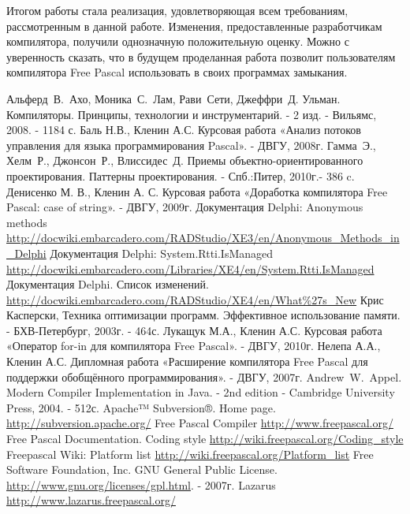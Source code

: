 \documentclass{imcs}
\begin{document}
Итогом работы стала реализация, удовлетворяющая всем требованиям, рассмотренным в данной работе.
Изменения, предоставленные разработчикам компилятора, получили однозначную положительную
оценку\cite{mantis}. Можно с уверенность сказать, что в будущем проделанная работа позволит
пользователям компилятора Free Pascal использовать в своих программах замыкания.

\pagebreak

\begin{thebibliography}{99}
 Альферд~В.~Ахо, Моника~С.~Лам, Рави~Сети, Джеффри~Д. Ульман. Компиляторы. Принципы, технологии и инструментарий. - 2 изд. - Вильямс, 2008. - 1184 с.
 Баль Н.В., Кленин А.С. Курсовая работа «Анализ потоков управления для языка программирования Pascal». - ДВГУ, 2008г.
 Гамма~Э., Хелм~Р., Джонсон~Р., Влиссидес~Д. Приемы объектно-ориентированного проектирования. Паттерны проектирования. - Спб.:Питер, 2010г.- 386 c.
 Денисенко М. В., Кленин А. С. Курсовая работа «Доработка компилятора Free Pascal: case of string». - ДВГУ, 2009г.
 Документация Delphi: Anonymous methods \url{http://docwiki.embarcadero.com/RADStudio/XE3/en/Anonymous_Methods_in_Delphi}
 Документация Delphi: System.Rtti.IsManaged \url{http://docwiki.embarcadero.com/Libraries/XE4/en/System.Rtti.IsManaged}
 Документация Delphi. Список изменений. \url{http://docwiki.embarcadero.com/RADStudio/XE4/en/What\%27s\_New}
 Крис Касперски, Техника оптимизации программ. Эффективное использование памяти. - БХВ-Петербург, 2003г. - 464с.
 Лукащук М.А., Кленин А.С. Курсовая работа «Оператор for-in для компилятора Free Pascal». - ДВГУ, 2010г.
 Нелепа А.А., Кленин А.С. Дипломная работа «Расширение компилятора Free Pascal для поддержки обобщённого программирования». - ДВГУ, 2007г.
 Andrew~W.~Appel. Modern Compiler Implementation in Java. - 2nd edition - Cambridge University Press, 2004. - 512с.
 Apache™ Subversion®. Home page. \url{http://subversion.apache.org/}
 Free Pascal Compiler \url{http://www.freepascal.org/}
 Free Pascal Documentation. Coding style \url{http://wiki.freepascal.org/Coding_style}
 Freepascal Wiki: Platform list \url{http://wiki.freepascal.org/Platform_list}
 Free Software Foundation, Inc. GNU General Public License. \url{http://www.gnu.org/licenses/gpl.html}. - 2007г.
 Lazarus \url{http://www.lazarus.freepascal.org/}

\end{thebibliography}
\end{document}
